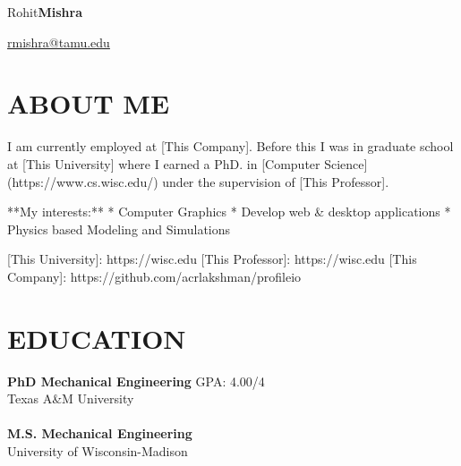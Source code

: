 \documentclass{res}
\begin{document}
	\hspace*{-0.05\textwidth}
	\begin{minipage}[t]{0.6\textwidth}
	\begin{flushleft}
	\vspace*{\fill}
	{\fontsize{45}{45}\selectfont Rohit\textbf{Mishra}}
	\end{flushleft}
	\end{minipage}
	\begin{minipage}[t]{0.44\textwidth}
	\begin{flushright}
	\href{mailto:rmishra@tamu.edu}{rmishra@tamu.edu} \\ 
	\end{flushright}
	\end{minipage}

	\begin{resume}
	
	
	\section{\MakeUppercase{About me}} \vskip 0.15in
	I am currently employed at [This Company]. Before this I was in graduate school at [This University] where I earned a PhD. in [Computer Science](https://www.cs.wisc.edu/) under the supervision of [This Professor].

**My interests:**
* Computer Graphics
* Develop web \& desktop applications
* Physics based Modeling and Simulations

[This University]: https://wisc.edu
[This Professor]: https://wisc.edu
[This Company]: https://github.com/acrlakshman/profileio
	
	
	
	\section{\MakeUppercase{Education}} \vskip 0.15in
	
	{\bf PhD Mechanical Engineering} \hfill GPA: 4.00/4 \\
	{Texas A\&M University \hfill } \\ \\
	{\bf M.S. Mechanical Engineering} \hfill  \\
	{University of Wisconsin-Madison \hfill } 
	

\end{resume}
\end{document}

